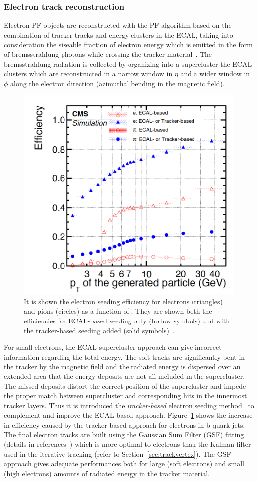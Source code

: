 \subsubsection{Electron track reconstruction}\label{sec:trackele}

Electron PF objects are reconstructed with the PF algorithm 
based on the combination of tracker tracks and energy clusters in the 
ECAL, taking into consideration the sizeable fraction
of electron energy which is emitted in the form of bremsstrahlung photons while
crossing the tracker material~\cite{CMS:particleflow}. The bremsstrahlung radiation is collected
by organizing into a supercluster the ECAL clusters which are
reconstructed in a narrow window in $\eta$ and a wider window in $\phi$ along the electron direction (azimuthal
bending in the magnetic field).
\begin{figure}
\includegraphics[width=.48\textwidth]{Figures/c2/eleecal}
  \caption{It is shown the electron seeding efficiency for electrons (triangles) and pions (circles) as a
function of \pt. They are shown both the efficiencies for ECAL-based
seeding only (hollow symbols) and with the tracker-based seeding added
(solid symbols)~\cite{CMS:particleflow}.}
  \label{fig:c2ele}
\end{figure} 
For small \pt electrons, the ECAL supercluster approach can give
incorrect information regarding the total energy. The soft tracks are
significantly bent in the tracker by the magnetic field and the
radiated energy is dispersed over an extended area that the energy
deposits are not all
included in the supercluster. The missed deposits distort the correct
position of the supercluster and impede the proper match between
supercluster and corresponding hits in the innermost tracker layers.
Thus it is introduced the \emph{tracker-based} electron seeding
method~\cite{CMS:particleflow} to complement and improve the
ECAL-based approach. Figure~\ref{fig:c2ele} shows the increase in efficiency caused by the tracker-based approach for electrons in b quark jets.\\
The final electron tracks are built using the Gaussian Sum Filter
(GSF) fitting (details in references~\cite{CMS:particleflow, Adam_2005}) which is more optimal to electrons than the Kalman-filter used
in the iterative tracking (refer to
Section~\ref{sec:trackvertex}). The GSF approach gives adequate
performances both for large (\ie soft electrons) and small (\ie high \pt electrons) amounts of radiated energy in the
tracker material.

